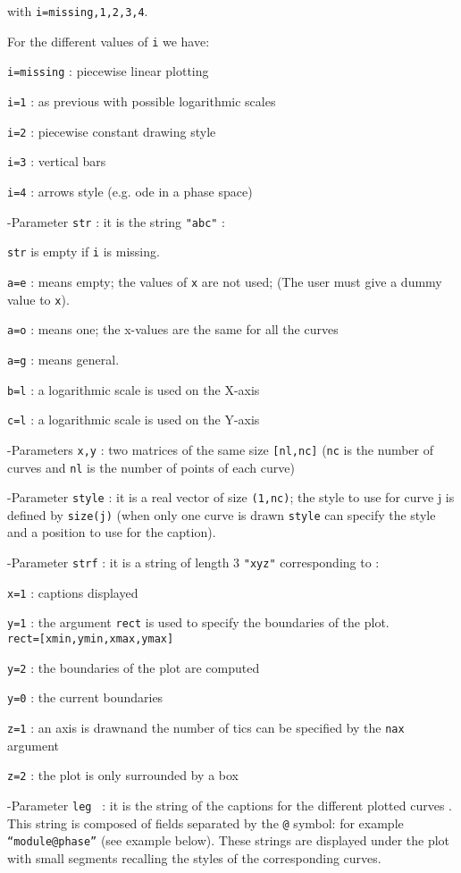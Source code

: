 with {\tt i=missing,1,2,3,4}.

For the different values of {\tt i} we have:

	{\tt i=missing}	: piecewise linear plotting

	{\tt i=1}	: as previous with possible logarithmic scales

	{\tt i=2}	: piecewise constant drawing style

	{\tt i=3}	: vertical bars

	{\tt i=4}	: arrows style (e.g. ode in a phase space)


-Parameter {\tt str} : it is the string {\tt "abc"} :
 
	{\tt str} is empty if {\tt i} is missing.

	{\tt a=e} : means empty; the values of {\tt x} are not used;
	   (The user must give a dummy value to {\tt x}).

	{\tt a=o} : means one; the x-values are the same for all the curves

	{\tt a=g} : means general. 

	{\tt b=l} : a logarithmic scale is used on the X-axis

	{\tt c=l} : a logarithmic scale is used on the Y-axis

-Parameters {\tt x,y} : two matrices of the same size {\tt [nl,nc]} ({\tt nc} 
is the number of curves and {\tt nl} is the number of points of each curve)

-Parameter {\tt style} : it is a real vector of size {\tt (1,nc)}; the style 
to use for curve j is defined by {\tt size(j)} (when only one curve is drawn 
{\tt style} can specify the style and a position to use for the caption).

-Parameter {\tt strf}  : it is a string of length 3 {\tt "xyz"} corresponding 
to :

	    {\tt x=1} : captions  displayed 

	    {\tt y=1} : the argument {\tt rect} is used to specify the 
		boundaries of the plot.\\  
		{\tt rect=[xmin,ymin,xmax,ymax]}

	    {\tt y=2}	: the boundaries of the	plot are computed 

	    {\tt y=0}	: the current boundaries 

	    {\tt z=1}	: an axis is drawnand  the number of tics can be specified by the {\tt nax} argument

	    {\tt z=2}	: the plot is only surrounded by a box

-Parameter {\tt leg } : it is the string of the captions for the different 
plotted curves . This string is composed of fields separated by the {\tt @} 
symbol: for example  {\tt ``module@phase''} (see example below). These 
strings are
displayed under the plot with  small segments recalling the styles of the 
corresponding curves.

